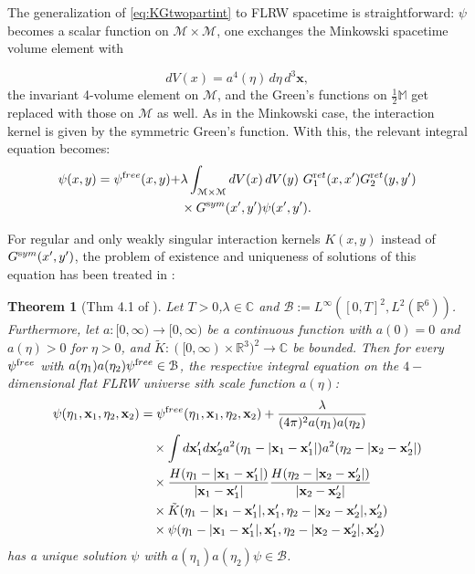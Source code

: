 \documentclass[b5paper,draft,openbib,12pt]{memoir}
\newtheorem{Thm}[Def]{Theorem}
\newcommand{\M}{\mathbb{M}}
\newcommand{\vx}{\mathbf{x}}
\newcommand{\ret}{{\textup ret}}
\newcommand{\sym}{{\textup sym}}
\newcommand{\free}{{\textup free}}
\begin{document}
The generalization of \eqref{eq:KGtwopartint} 
to FLRW spacetime is straightforward: $\psi$ becomes a scalar 
function on $\mathcal{M}\times\mathcal{M}$, one exchanges the 
Minkowski spacetime volume element with 

\begin{equation}
	dV(x) = a^4(\eta) \, d\eta \, d^3 \vx,
\end{equation}
the invariant 4-volume 
element on $\mathcal{M}$, and the Green's functions on 
$\tfrac{1}{2}\M$ get replaced with those on $\mathcal{M}$ as well. 
As in the Minkowski case, the interaction kernel is given by the 
symmetric Green's function. With this, the relevant integral 
equation becomes:
\begin{align}\notag
  \psi(x,y) = \psi^\free(x,y) +& \lambda \int_{\mathcal{M}\times \mathcal{M}} dV(x) \, dV(y)~G_1^\ret(x,x')G_2^\ret(y,y') \\
  & \times G^\sym(x',y') \psi(x',y').
\end{align}

For regular and only weakly singular interaction kernels $K(x,y)$ 
instead of $G^\sym(x',y')$, the problem of existence and uniqueness 
of solutions of this equation has been treated in 
\cite{lienertcurved}:


\begin{Thm}[Thm 4.1 of \cite{lienertcurved}]
Let \(T>0\),\(\lambda\in\mathbb{C}\) and 
\(\mathcal{B}:=L^\infty([0,T]^2,L^2(\mathbb{R}^6))\). Furthermore, let \(a:[0,\infty)\rightarrow [0,\infty)\)
be a continuous function with \(a(0)=0\) and 
\(a(\eta)>0\) for \(\eta>0\), and 
\(\tilde{K}:([0,\infty)\times \mathbb{R}^{3})^2\rightarrow \mathbb{C}\)
be bounded. Then for every \(\psi^\free\) with 
\(a(\eta_1)a(\eta_2)\psi^\free\in \mathcal{B} \),
the respective integral equation on the \(4-\)dimensional 
flat FLRW universe sith scale function \(a(\eta)\): 
\begin{align}\label{KG curved bounded}
  \psi(\eta_1, \vx_1,\eta_2,\vx_2)&=\psi^{\free}(\eta_1, \vx_1,\eta_2,\vx_2)
  +\frac{\lambda}{(4\pi)^2 a(\eta_1)a(\eta_2)}\\\notag
  &\quad \times \int d \vx_1' d \vx_2' 
  a^2(\eta_1-|\vx_1-\vx_1'|)a^2(\eta_2-|\vx_2-\vx_2'|)\\\notag
  &\quad \times \frac{H(\eta_1-|\vx_1-\vx_1'|)}{|\vx_1-\vx_1'|}
  \frac{H(\eta_2-|\vx_2-\vx_2'|)}{|\vx_2-\vx_2'|}\\\notag
  &\quad\times \tilde{K}(\eta_1-|\vx_1-\vx_1'|,\vx_1',\eta_2-|\vx_2-\vx_2'|,\vx_2')\\\notag
  &\quad\times \psi(\eta_1-|\vx_1-\vx_1'|,\vx_1',\eta_2-|\vx_2-\vx_2'|,\vx_2')
\end{align}
has a unique solution \(\psi\) with 
\(a(\eta_1)a(\eta_2)\psi\in \mathcal{B}\).
\end{Thm}
\end{document}
